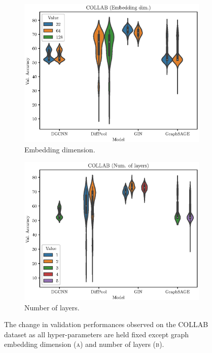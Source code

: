 \begin{figure}[h!]
    \centering
    \begin{subfigure}[b]{0.49\textwidth}
        \centering
        \includegraphics[width=\textwidth]{Figures/Chapter4/collab-embedding.eps}
        \caption{Embedding dimension.}
        \label{fig:collab-layer}
    \end{subfigure}
    \hfill
    \begin{subfigure}[b]{0.49\textwidth}
        \centering
        \includegraphics[width=\textwidth]{Figures/Chapter4/collab-layers.eps}
        \caption{Number of layers.}
        \label{fig:collab-emb}
    \end{subfigure}
    \caption{The change in validation performances observed on the COLLAB dataset as all hyper-parameters are held fixed except graph embedding dimension \textsc{(a)} and number of layers \textsc{(b)}.}
       \label{fig:collab-posthoc}
\end{figure}

